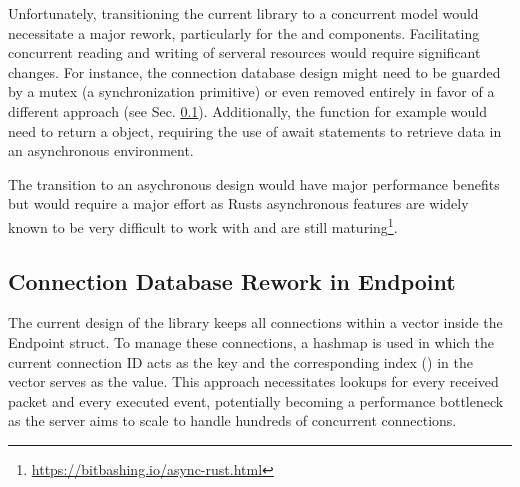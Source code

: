 Unfortunately, transitioning the current library to a concurrent model would necessitate a major rework, particularly for the
 and  components. Facilitating concurrent reading and writing of serveral resources 
would require significant changes. For instance, the connection database design might need to be guarded by a mutex (a synchronization
primitive) or even removed entirely in favor of a different approach (see Sec. \ref{connection_db_rework}). Additionally, the
 function for example would need to return a  object, requiring the use of await
statements to retrieve data in an asynchronous environment.

The transition to an asychronous design would have major performance benefits but would require a major effort as Rusts asynchronous
features are widely known to be very difficult to work with and are still maturing\footnote{\url{https://bitbashing.io/async-rust.html}}.

\subsection{Connection Database Rework in Endpoint} \label{connection_db_rework}


The current design of the library keeps all connections within a vector inside the Endpoint struct. To manage these connections,
a hashmap is used in which the current connection ID acts as the key and the corresponding index () in the
vector serves as the value. This approach necessitates lookups for every received packet and every executed event, potentially
becoming a performance bottleneck as the server aims to scale to handle hundreds of concurrent connections.


